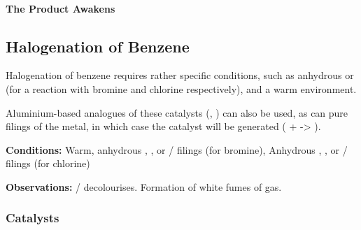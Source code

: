 			\paragraph{The Product Awakens}
















		\pagebreak
		\subsection{Halogenation of Benzene}

			Halogenation of benzene requires rather specific conditions, such as anhydrous  or  (for a reaction
			with bromine and chlorine respectively), and a warm environment.

			Aluminium-based analogues of these catalysts (, ) can also be used, as can pure
			filings of the metal, in which case the catalyst will be generated  ( +  -> ).


			\vspace{1.5em}
			\vbox{\textbf{Conditions:}	\tabto{35mm}Warm, anhydrous , , or  / \ch{\Al} filings (for bromine),
										\tabto{35mm}Anhydrous , , or
													 / \ch{\Al} filings (for chlorine)}

			\vspace{0.75em}
			\vbox{\textbf{Observations:}\tabto{35mm}  /   decolourises.
										\tabto{35mm}Formation of white fumes of  gas.}


			\hypertarget{BenzeneHalogenationCatalyst}{}
			\subsubsection{Catalysts}

